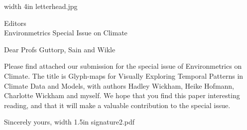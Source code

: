 \documentclass{letter}
\makeatletter
\def\apl#1#2{
\begin{letter}{#1}
\signature{Professor Dianne Cook\\Department of Statistics\\Iowa State University 
\\Ames, Iowa 50011-1210\\ Phone (515) 294 8865\\{\tt dicook@iastate.edu}}
\opening{{Dear #2}}

Please find attached our submission for the special issue of Environmetrics on Climate. The title is Glyph-maps for Visually Exploring Temporal Patterns in Climate Data and Models, with authors Hadley Wickham, Heike Hofmann, Charlotte Wickham and myself. We hope that you find this paper interesting reading, and that it will make a valuable contribution  to the special issue.

\closing{Sincerely yours,
{\pdfimage width 1.5in {signature2.pdf}}}
\end{letter}}
\makeatother
\begin{document}
{{\pdfimage width 4in {letterhead.jpg}}}
\apl{Editors \\Environmetrics Special Issue on Climate}{Profs Guttorp, Sain and Wikle}
\end{document}
